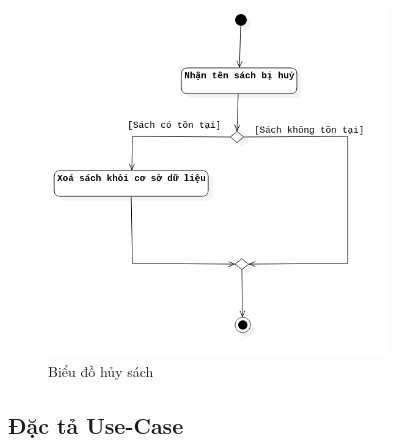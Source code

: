 \documentclass[12pt]{report}
\begin{document}
\begin{figure}[H]
\centering
\includegraphics[width=9cm]{figures/huysach.png}
\caption{Biểu đồ hủy sách}
\end{figure}

\subsection{Đặc tả Use-Case}
\end{document}
